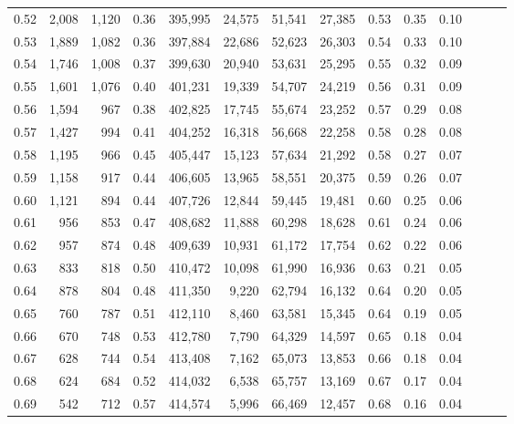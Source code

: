 \begin{tabular}{rrrrrrrrrrrrrr}
0.52 &   2,008 &  1,120 &  0.36 &  395,995 &   24,575 &  51,541 &  27,385 &  0.53 &  0.35 &      0.10 \\
0.53 &   1,889 &  1,082 &  0.36 &  397,884 &   22,686 &  52,623 &  26,303 &  0.54 &  0.33 &      0.10 \\
0.54 &   1,746 &  1,008 &  0.37 &  399,630 &   20,940 &  53,631 &  25,295 &  0.55 &  0.32 &      0.09 \\
0.55 &   1,601 &  1,076 &  0.40 &  401,231 &   19,339 &  54,707 &  24,219 &  0.56 &  0.31 &      0.09 \\
0.56 &   1,594 &    967 &  0.38 &  402,825 &   17,745 &  55,674 &  23,252 &  0.57 &  0.29 &      0.08 \\
0.57 &   1,427 &    994 &  0.41 &  404,252 &   16,318 &  56,668 &  22,258 &  0.58 &  0.28 &      0.08 \\
0.58 &   1,195 &    966 &  0.45 &  405,447 &   15,123 &  57,634 &  21,292 &  0.58 &  0.27 &      0.07 \\
0.59 &   1,158 &    917 &  0.44 &  406,605 &   13,965 &  58,551 &  20,375 &  0.59 &  0.26 &      0.07 \\
0.60 &   1,121 &    894 &  0.44 &  407,726 &   12,844 &  59,445 &  19,481 &  0.60 &  0.25 &      0.06 \\
0.61 &     956 &    853 &  0.47 &  408,682 &   11,888 &  60,298 &  18,628 &  0.61 &  0.24 &      0.06 \\
0.62 &     957 &    874 &  0.48 &  409,639 &   10,931 &  61,172 &  17,754 &  0.62 &  0.22 &      0.06 \\
0.63 &     833 &    818 &  0.50 &  410,472 &   10,098 &  61,990 &  16,936 &  0.63 &  0.21 &      0.05 \\
0.64 &     878 &    804 &  0.48 &  411,350 &    9,220 &  62,794 &  16,132 &  0.64 &  0.20 &      0.05 \\
0.65 &     760 &    787 &  0.51 &  412,110 &    8,460 &  63,581 &  15,345 &  0.64 &  0.19 &      0.05 \\
0.66 &     670 &    748 &  0.53 &  412,780 &    7,790 &  64,329 &  14,597 &  0.65 &  0.18 &      0.04 \\
0.67 &     628 &    744 &  0.54 &  413,408 &    7,162 &  65,073 &  13,853 &  0.66 &  0.18 &      0.04 \\
0.68 &     624 &    684 &  0.52 &  414,032 &    6,538 &  65,757 &  13,169 &  0.67 &  0.17 &      0.04 \\
0.69 &     542 &    712 &  0.57 &  414,574 &    5,996 &  66,469 &  12,457 &  0.68 &  0.16 &      0.04 \\

\end{tabular}
